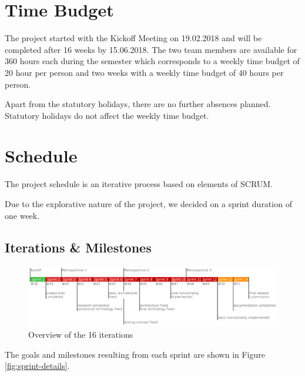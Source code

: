 \section{Time Budget}

The project started with the Kickoff Meeting on 19.02.2018 and will be completed after 16 weeks by 15.06.2018.
The two team members are available for 360 hours each during the semester which corresponds to a weekly time budget of 20 hour per person and two weeks with a weekly time budget of 40 hours per person.

Apart from the statutory holidays, there are no further absences planned. Statutory holidays do not affect the weekly time budget. %

\section{Schedule}
The project schedule is an iterative process based on elements of SCRUM.

Due to the explorative nature of the project, we decided on a sprint duration of one week. %
\subsection{Iterations \& Milestones}

\begin{figure}[h!]
    \centering
    \includegraphics[width=1\linewidth]{resources/overview}
    \caption{Overview of the 16 iterations}
    \label{fig:overview}
\end{figure}

The goals and milestones resulting from each sprint are shown in Figure \ref{fig:sprint-details}.

